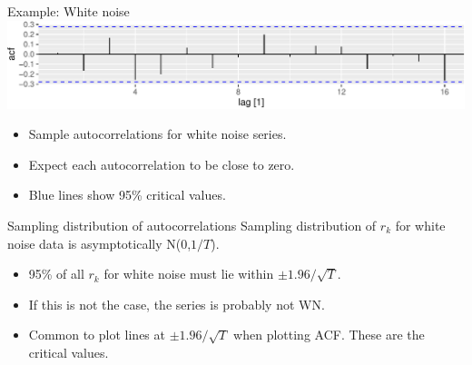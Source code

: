 \documentclass[14pt,ignorenonframetext,aspectratio=169]{beamer}
\providecommand{\tightlist}{%
  \setlength{\itemsep}{0pt}\setlength{\parskip}{0pt}}
\begin{document}
\begin{frame}[fragile]{Example: White noise}
\includegraphics{2-tsgraphics_files/figure-beamer/unnamed-chunk-33-1.pdf}

\pause

\begin{itemize}
\tightlist
\item
  Sample autocorrelations for white noise series.
\item
  Expect each autocorrelation to be close to zero.
\item
  Blue lines show 95\% critical values.
\end{itemize}

\vspace*{10cm}
\end{frame}

\begin{frame}{\large Sampling distribution of autocorrelations}
\protect\hypertarget{sampling-distribution-of-autocorrelations}{}
Sampling distribution of \(r_k\) for white noise data is asymptotically
N(0,\(1/T\)).\pause

\begin{itemize}
\tightlist
\item
  95\% of all \(r_k\) for white noise must lie within
  \(\pm 1.96/\sqrt{T}\).
\item
  If this is not the case, the series is probably not WN.
\item
  Common to plot lines at \(\pm 1.96/\sqrt{T}\) when plotting ACF. These
  are the \alert{critical values}.
\end{itemize}
\end{frame}
\end{document}
